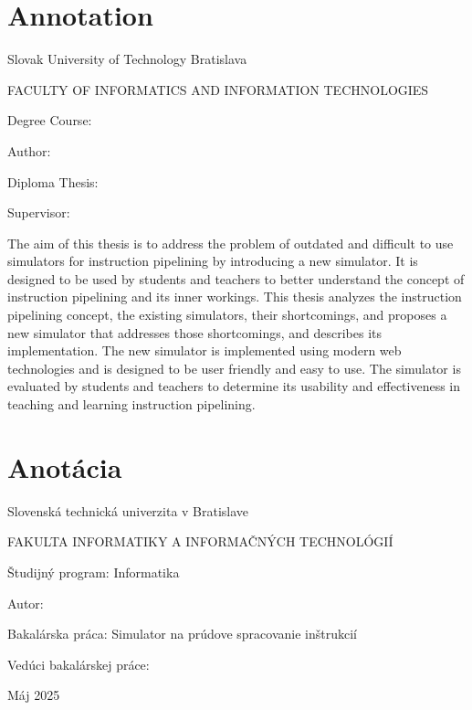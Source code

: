 \thispagestyle{empty}

\section*{Annotation}

\begin{minipage}[t]{1\columnwidth}%
Slovak University of Technology Bratislava 

FACULTY OF INFORMATICS AND INFORMATION TECHNOLOGIES

Degree Course: \myStudyProgram
\newline

Author: \myName

Diploma Thesis: \myTitle

Supervisor: \mySupervisor

\myDate%
\end{minipage}

\bigskip{}

The aim of this thesis is to address the problem of outdated and difficult to use simulators for instruction pipelining by introducing a new simulator. It is designed to be used by students and teachers to better understand the concept of instruction pipelining and its inner workings. This thesis analyzes the instruction pipelining concept, the existing simulators, their shortcomings, and proposes a new simulator that addresses those shortcomings, and describes its implementation. The new simulator is implemented using modern web technologies and is designed to be user friendly and easy to use. The simulator is evaluated by students and teachers to determine its usability and effectiveness in teaching and learning instruction pipelining.


\newpage{}\thispagestyle{empty}

\newpage
\thispagestyle{empty}
\mbox{}
\newpage

\thispagestyle{empty}
\section*{Anotácia}

\begin{minipage}[t]{1\columnwidth}%
Slovenská technická univerzita v Bratislave

FAKULTA INFORMATIKY A INFORMAČNÝCH TECHNOLÓGIÍ

Študijný program: Informatika
\newline

Autor: \myName

Bakalárska práca: Simulator na prúdove spracovanie inštrukcií

Vedúci bakalárskej práce: \mySupervisor

Máj 2025
\end{minipage}


